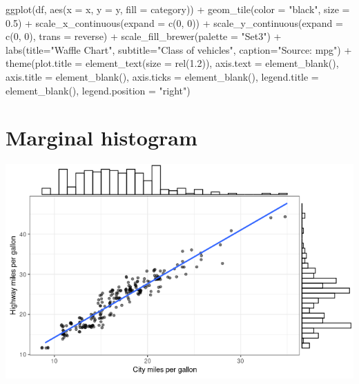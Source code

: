 \documentclass[
]{book}
\newenvironment{Shaded}{\begin{snugshade}}{\end{snugshade}}
\newcommand{\AttributeTok}[1]{\textcolor[rgb]{0.77,0.63,0.00}{#1}}
\newcommand{\DecValTok}[1]{\textcolor[rgb]{0.00,0.00,0.81}{#1}}
\newcommand{\FloatTok}[1]{\textcolor[rgb]{0.00,0.00,0.81}{#1}}
\newcommand{\FunctionTok}[1]{\textcolor[rgb]{0.00,0.00,0.00}{#1}}
\newcommand{\NormalTok}[1]{#1}
\newcommand{\SpecialCharTok}[1]{\textcolor[rgb]{0.00,0.00,0.00}{#1}}
\newcommand{\StringTok}[1]{\textcolor[rgb]{0.31,0.60,0.02}{#1}}
\begin{document}
\begin{Shaded}
\begin{Highlighting}[]
\FunctionTok{ggplot}\NormalTok{(df, }\FunctionTok{aes}\NormalTok{(}\AttributeTok{x =}\NormalTok{ x, }\AttributeTok{y =}\NormalTok{ y, }\AttributeTok{fill =}\NormalTok{ category)) }\SpecialCharTok{+} 
        \FunctionTok{geom\_tile}\NormalTok{(}\AttributeTok{color =} \StringTok{"black"}\NormalTok{, }\AttributeTok{size =} \FloatTok{0.5}\NormalTok{) }\SpecialCharTok{+}
        \FunctionTok{scale\_x\_continuous}\NormalTok{(}\AttributeTok{expand =} \FunctionTok{c}\NormalTok{(}\DecValTok{0}\NormalTok{, }\DecValTok{0}\NormalTok{)) }\SpecialCharTok{+}
        \FunctionTok{scale\_y\_continuous}\NormalTok{(}\AttributeTok{expand =} \FunctionTok{c}\NormalTok{(}\DecValTok{0}\NormalTok{, }\DecValTok{0}\NormalTok{), }\AttributeTok{trans =} \StringTok{\textquotesingle{}reverse\textquotesingle{}}\NormalTok{) }\SpecialCharTok{+}
        \FunctionTok{scale\_fill\_brewer}\NormalTok{(}\AttributeTok{palette =} \StringTok{"Set3"}\NormalTok{) }\SpecialCharTok{+}
        \FunctionTok{labs}\NormalTok{(}\AttributeTok{title=}\StringTok{"Waffle Chart"}\NormalTok{, }\AttributeTok{subtitle=}\StringTok{"\textquotesingle{}Class\textquotesingle{} of vehicles"}\NormalTok{,}
             \AttributeTok{caption=}\StringTok{"Source: mpg"}\NormalTok{) }\SpecialCharTok{+} 
        \FunctionTok{theme}\NormalTok{(}\AttributeTok{plot.title =} \FunctionTok{element\_text}\NormalTok{(}\AttributeTok{size =} \FunctionTok{rel}\NormalTok{(}\FloatTok{1.2}\NormalTok{)),}
              \AttributeTok{axis.text =} \FunctionTok{element\_blank}\NormalTok{(),}
              \AttributeTok{axis.title =} \FunctionTok{element\_blank}\NormalTok{(),}
              \AttributeTok{axis.ticks =} \FunctionTok{element\_blank}\NormalTok{(),}
              \AttributeTok{legend.title =} \FunctionTok{element\_blank}\NormalTok{(),}
              \AttributeTok{legend.position =} \StringTok{"right"}\NormalTok{)}
\end{Highlighting}
\end{Shaded}

\hypertarget{marginal-histogram}{%
\section{Marginal histogram}\label{marginal-histogram}}

\includegraphics{images/10/000046.png}
\end{document}
